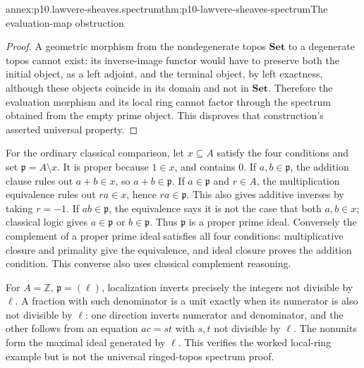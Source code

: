 \begin{annexitem}{annex:p10.lawvere-sheaves.spectrum}{thm:p10-lawvere-sheaves-spectrum}{The evaluation-map obstruction}
\begin{proof}
A geometric morphism from the nondegenerate topos
\(\mathbf{Set}\) to a degenerate topos cannot exist:
its inverse-image functor would have to preserve both the
initial object, as a left adjoint, and the terminal object,
by left exactness, although these objects coincide in its
domain and not in \(\mathbf{Set}\).
Therefore the evaluation morphism and its local ring cannot
factor through the spectrum obtained from the empty prime
object. This disproves that construction's asserted universal
property.
\end{proof}
\end{annexitem}

For the ordinary classical comparison, let \(x\subseteq A\)
satisfy the four conditions and set \(\mathfrak p=A\setminus x\).
It is proper because \(1\in x\), and contains \(0\).
If \(a,b\in\mathfrak p\), the addition clause rules out
\(a+b\in x\), so \(a+b\in\mathfrak p\).  If
\(a\in\mathfrak p\) and \(r\in A\), the multiplication
equivalence rules out \(ra\in x\), hence \(ra\in\mathfrak p\).
This also gives additive inverses by taking \(r=-1\).
If \(ab\in\mathfrak p\), the equivalence says it is not the
case that both \(a,b\in x\); classical logic gives
\(a\in\mathfrak p\) or \(b\in\mathfrak p\).  Thus
\(\mathfrak p\) is a proper prime ideal.  Conversely the
complement of a proper prime ideal satisfies all four conditions:
multiplicative closure and primality give the equivalence, and
ideal closure proves the addition condition.  This converse also
uses classical complement reasoning.

For \(A=\mathbb Z\), \(\mathfrak p=(\ell)\), localization
inverts precisely the integers not divisible by \(\ell\).
A fraction with such denominator is a unit exactly when its
numerator is also not divisible by \(\ell\): one direction
inverts numerator and denominator, and the other follows from
an equation \(ac=st\) with \(s,t\) not divisible by
\(\ell\).  The nonunits form the maximal ideal generated by
\(\ell\).  This verifies the worked local-ring example but is
not the universal ringed-topos spectrum proof.





